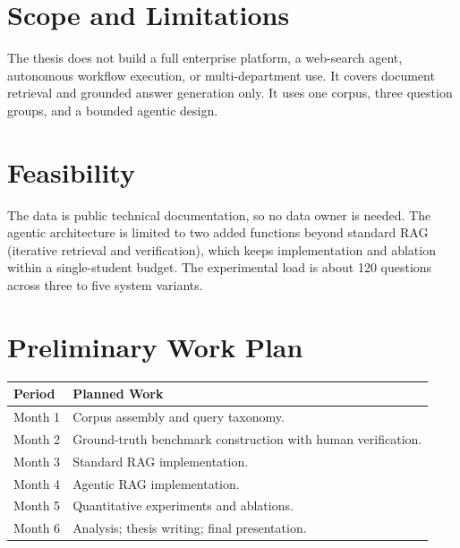 \documentclass[10pt,a4paper]{article}
\begin{document}
\section{Scope and Limitations}

The thesis does not build a full enterprise platform, a web-search agent, autonomous workflow execution, or multi-department use. It covers document retrieval and grounded answer generation only. It uses one corpus, three question groups, and a bounded agentic design.

\section{Feasibility}

The data is public technical documentation, so no data owner is needed. The agentic architecture is limited to two added functions beyond standard RAG (iterative retrieval and verification), which keeps implementation and ablation within a single-student budget. The experimental load is about 120 questions across three to five system variants.

\section{Preliminary Work Plan}

\begin{tabularx}{\textwidth}{|p{1.9cm}|X|}
\hline
\rowcolor{lightgray}
\textbf{Period} & \textbf{Planned Work} \\
\hline
Month 1 & Corpus assembly and query taxonomy. \\
\hline
Month 2 & Ground-truth benchmark construction with human verification. \\
\hline
Month 3 & Standard RAG implementation. \\
\hline
Month 4 & Agentic RAG implementation. \\
\hline
Month 5 & Quantitative experiments and ablations. \\
\hline
Month 6 & Analysis; thesis writing; final presentation. \\
\hline
\end{tabularx}
\end{document}
